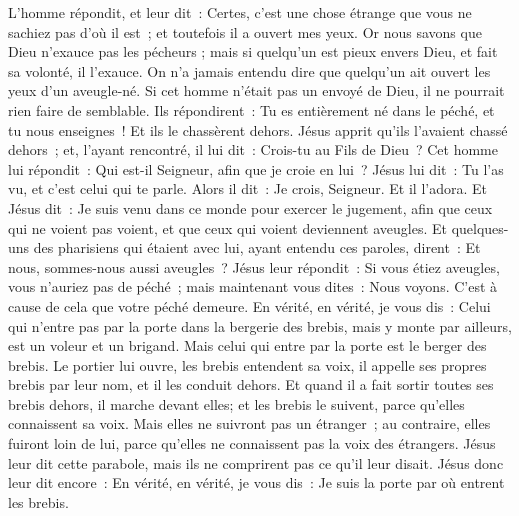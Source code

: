 \begin{multicols}{2}
L'homme répondit, et leur dit~: Certes, c'est une chose étrange que vous ne sachiez pas d'où il est~; et toutefois il a ouvert mes yeux.
Or nous savons que Dieu n'exauce pas les pécheurs ; mais si quelqu'un est pieux envers Dieu, et fait sa volonté, il l'exauce.
On n'a jamais entendu dire que quelqu'un ait ouvert les yeux d'un aveugle-né.
Si cet homme n'était pas un envoyé de Dieu, il ne pourrait rien faire de semblable.
Ils répondirent~: Tu es entièrement né dans le péché, et tu nous enseignes~! Et ils le chassèrent dehors.
Jésus apprit qu'ils l'avaient chassé dehors~; et, l'ayant rencontré, il lui dit~: Crois-tu au Fils de Dieu~?
Cet homme lui répondit~: Qui est-il Seigneur, afin que je croie en lui~?
Jésus lui dit~: Tu l'as vu, et c'est celui qui te parle.
Alors il dit~: Je crois, Seigneur. Et il l'adora.
Et Jésus dit~: Je suis venu dans ce monde pour exercer le jugement, afin que ceux qui ne voient pas voient, et que ceux qui voient deviennent aveugles.
Et quelques-uns des pharisiens qui étaient avec lui, ayant entendu ces paroles, dirent~: Et nous, sommes-nous aussi aveugles~?
Jésus leur répondit~: Si vous étiez aveugles, vous n'auriez pas de péché~; mais maintenant vous dites~: Nous voyons. C'est à cause de cela que votre péché demeure.
\VerseOne{}En vérité, en vérité, je vous dis~: Celui qui n'entre pas par la porte dans la bergerie des brebis, mais y monte par ailleurs, est un voleur et un brigand.
Mais celui qui entre par la porte est le berger des brebis.
Le portier lui ouvre, les brebis entendent sa voix, il appelle ses propres brebis par leur nom, et il les conduit dehors.
Et quand il a fait sortir toutes ses brebis dehors, il marche devant elles; et les brebis le suivent, parce qu'elles connaissent sa voix.
Mais elles ne suivront pas un étranger~; au contraire, elles fuiront loin de lui, parce qu'elles ne connaissent pas la voix des étrangers.
Jésus leur dit cette parabole, mais ils ne comprirent pas ce qu'il leur disait.
Jésus donc leur dit encore~: En vérité, en vérité, je vous dis~: Je suis la porte par où entrent les brebis.

\end{multicols}
